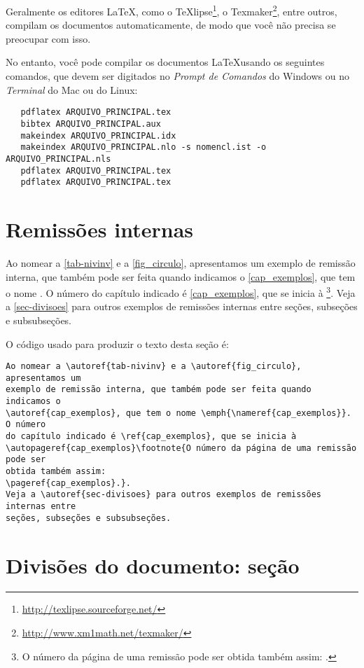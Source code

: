 Geralmente os editores \LaTeX, como o
TeXlipse\footnote{\url{http://texlipse.sourceforge.net/}}, o
Texmaker\footnote{\url{http://www.xm1math.net/texmaker/}}, entre outros,
compilam os documentos automaticamente, de modo que você não precisa se
preocupar com isso.

No entanto, você pode compilar os documentos \LaTeX usando os seguintes
comandos, que devem ser digitados no \emph{Prompt de Comandos} do Windows ou no
\emph{Terminal} do Mac ou do Linux:

\begin{verbatim}
   pdflatex ARQUIVO_PRINCIPAL.tex
   bibtex ARQUIVO_PRINCIPAL.aux
   makeindex ARQUIVO_PRINCIPAL.idx 
   makeindex ARQUIVO_PRINCIPAL.nlo -s nomencl.ist -o ARQUIVO_PRINCIPAL.nls
   pdflatex ARQUIVO_PRINCIPAL.tex
   pdflatex ARQUIVO_PRINCIPAL.tex
\end{verbatim}

\section{Remissões internas}

Ao nomear a \autoref{tab-nivinv} e a \autoref{fig_circulo}, apresentamos um
exemplo de remissão interna, que também pode ser feita quando indicamos o
\autoref{cap_exemplos}, que tem o nome \emph{}. O número
do capítulo indicado é \ref{cap_exemplos}, que se inicia à
\footnote{O número da página de uma remissão pode ser
  obtida também assim:
  \pageref{cap_exemplos}.}.
Veja a \autoref{sec-divisoes} para outros exemplos de remissões internas entre
seções, subseções e subsubseções.

O código usado para produzir o texto desta seção é:

\begin{verbatim}
Ao nomear a \autoref{tab-nivinv} e a \autoref{fig_circulo}, apresentamos um
exemplo de remissão interna, que também pode ser feita quando indicamos o
\autoref{cap_exemplos}, que tem o nome \emph{\nameref{cap_exemplos}}. O número
do capítulo indicado é \ref{cap_exemplos}, que se inicia à
\autopageref{cap_exemplos}\footnote{O número da página de uma remissão pode ser
obtida também assim:
\pageref{cap_exemplos}.}.
Veja a \autoref{sec-divisoes} para outros exemplos de remissões internas entre
seções, subseções e subsubseções.
\end{verbatim}

\section{Divisões do documento: seção}\label{sec-divisoes}

